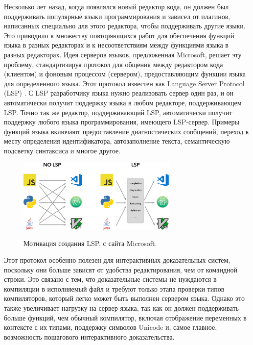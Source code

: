 Несколько лет назад, когда появлялся новый редактор кода,
он должен был поддерживать популярные языки программирования
и зависел от плагинов, написанных специально для этого редактора, чтобы поддерживать другие языки.
Это приводило к множеству повторяющихся работ для обеспечения функций языка в разных редакторах
и к несоответствиям между функциями языка в разных редакторах.
Идея серверов языков, предложенная Microsoft, решает эту проблему,
стандартизируя протокол для общения между редактором кода (клиентом) и фоновым процессом (сервером),
предоставляющим функции языка для определенного языка. Этот протокол известен как Language Server Protocol (LSP) \cite{Gunasinghe2022}.
С LSP разработчику языка нужно реализовать сервер один раз,
и он автоматически получит поддержку языка в любом редакторе, поддерживающем LSP.
Точно так же редактор, поддерживающий LSP, автоматически получит поддержку любого языка программирования, имеющего LSP-сервер.
Примеры функций языка включают предоставление диагностических сообщений, переход к месту определения идентификатора, автозаполнение текста, семантическую подсветку синтаксиса и многое другое.

\begin{figure}
  \centering
  \includegraphics[width=0.7\textwidth]{figs/LSP-MxN.png}
  \label{figure:lsp}
  \caption{
    Мотивация создания LSP, с сайта Microsoft.
    \protect\footnotemark
  }
\end{figure}

Этот протокол особенно полезен для интерактивных доказательных систем, поскольку
они больше зависят от удобства редактирования, чем от командной строки.
Это связано с тем, что доказательные системы не нуждаются в компиляции
в исполняемый файл и требуют только этапа проверки типов компиляторов,
который легко может быть выполнен сервером языка. Однако это также увеличивает нагрузку
на сервер языка, так как он должен поддерживать больше функций, чем обычный компилятор,
включая отображение переменных в контексте с их типами, поддержку символов Unicode
и, самое главное, возможность пошагового интерактивного доказательства.

